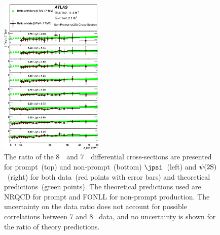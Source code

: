 \begin{description}[style=unboxed,leftmargin=0cm]
\begin{figure} [!ht]
\begin{center}
    \includegraphics[width=0.44\textwidth]{figures/rt_th_xSecNP_P.eps}\hfil
    \caption{The ratio of the 8~\TeV\ and 7~\TeV\ differential cross-sections
	    are presented for prompt~(top) and non-prompt~(bottom) $\jpsi$~(left) and 
	    $\psi(2\mathrm{S})$~(right) for both data~(red points with error bars) and theoretical predictions~(green points).
	    The theoretical predictions used are NRQCD for prompt and FONLL for non-prompt production.
	    The uncertainty on the data ratio does not account for possible correlations between 7 and 8 \TeV\  data, and no uncertainty is shown 
	    for the ratio of theory predictions.
}
    \label{fig:xsecEnergyRatio}
  \end{center}
\end{figure} 


\end{description}
